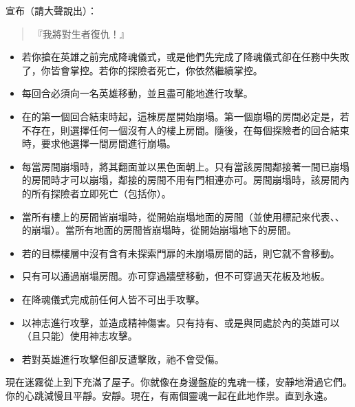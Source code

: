 宣布（請大聲說出）：
\begin{quote}
	『我將對生者復仇！』
\end{quote}

\vfill\null\pagebreak

\begin{itemize}
	\item 若你搶在英雄之前完成降魂儀式，或是他們先完成了降魂儀式卻在任務中失敗了，你皆會掌控。若你的探險者死亡，你依然繼續掌控。
	\item {}每回合必須向一名英雄移動，並且盡可能地進行攻擊。
	\item 在的第一個回合結束時起，這棟房屋開始崩塌。第一個崩塌的房間必定是，若不存在，則選擇任何一個沒有人的樓上房間。隨後，在每個探險者的回合結束時，要求他選擇一間房間進行崩塌。
	\item 每當房間崩塌時，將其翻面並以黑色面朝上。只有當該房間鄰接著一間已崩塌的房間時才可以崩塌，鄰接的房間不用有門相連亦可。房間崩塌時，該房間內的所有探險者立即死亡（包括你）。
	\item 當所有樓上的房間皆崩塌時，從開始崩塌地面的房間（並使用標記來代表、、的崩塌）。當所有地面的房間皆崩塌時，從開始崩塌地下的房間。
	\item 若的目標樓層中沒有含有未探索門扉的未崩塌房間的話，則它就不會移動。
	\item 只有可以通過崩塌房間。亦可穿過牆壁移動，但不可穿過天花板及地板。
\end{itemize}

\vspace*{-1em}
\begin{itemize}
	\item 在降魂儀式完成前任何人皆不可出手攻擊。\iffalse{如果英雄控制\Monster*{Ghost}，他們會告知你特殊攻擊規則。}\fi
	\item {}以神志進行攻擊，並造成精神傷害。只有持有、或是與同處於內的英雄可以（且只能）使用神志攻擊。
	\item 若對英雄進行攻擊但卻反遭擊敗，祂不會受傷。
\end{itemize}

\begin{HauntStory}
	現在迷霧從上到下充滿了屋子。你就像在身邊盤旋的鬼魂一樣，安靜地滑過它們。你的心跳減慢且平靜。安靜。現在，有兩個靈魂一起在此地作祟。直到永遠。
\end{HauntStory}
